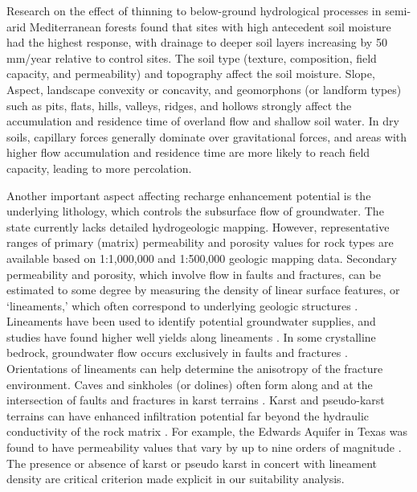 \documentclass[
  number,
  preprint,
  3p,
  onecolumn]{elsarticle}
\begin{document}
Research on the effect of thinning to below-ground hydrological
processes in semi-arid Mediterranean forests found that sites with high
antecedent soil moisture had the highest response, with drainage to
deeper soil layers increasing by 50 mm/year relative to control
sites\citep{del_campo_effectiveness_2019}. The soil type (texture,
composition, field capacity, and permeability) and topography affect the
soil moisture. Slope, Aspect, landscape convexity or concavity, and
geomorphons (or landform types) such as pits, flats, hills, valleys,
ridges, and hollows strongly affect the accumulation and residence time
of overland flow and shallow soil
water\citep{parker1982, jasiewicz2013}. In dry soils, capillary forces
generally dominate over gravitational forces, and areas with higher flow
accumulation and residence time are more likely to reach field capacity,
leading to more percolation\citep{woessner2020}.

Another important aspect affecting recharge enhancement potential is the
underlying lithology, which controls the subsurface flow of groundwater.
The state currently lacks detailed hydrogeologic mapping. However,
representative ranges of primary (matrix) permeability and porosity
values for rock types are available based on 1:1,000,000 and 1:500,000
geologic mapping data\citep{huscroft2018, freeze1979, woessner2020}.
Secondary permeability and porosity, which involve flow in faults and
fractures, can be estimated to some degree by measuring the density of
linear surface features, or `lineaments,' which often correspond to
underlying geologic structures \citep{oleary1976, sander2007}.
Lineaments have been used to identify potential groundwater supplies,
and studies have found higher well yields along lineaments
\citep{sander2007}. In some crystalline bedrock, groundwater flow occurs
exclusively in faults and fractures \citep{meijerink2007, nyborg2007}.
Orientations of lineaments can help determine the anisotropy of the
fracture environment\citep{meijerink2007}. Caves and sinkholes (or
dolines) often form along and at the intersection of faults and
fractures in karst terrains \citep{ford2007}. Karst and pseudo-karst
terrains can have enhanced infiltration potential far beyond the
hydraulic conductivity of the rock matrix \citep{kresic2013}. For
example, the Edwards Aquifer in Texas was found to have permeability
values that vary by up to nine orders of magnitude \citep{halihan1998}.
The presence or absence of karst or pseudo karst in concert with
lineament density are critical criterion made explicit in our
suitability analysis.
\end{document}
